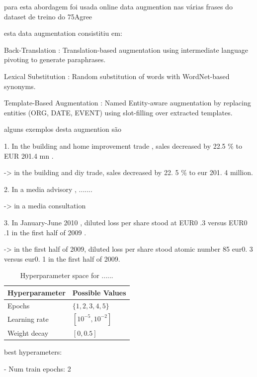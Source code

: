 \documentclass[conference]{IEEEtran}
\begin{document}
para esta abordagem foi usada online data augmention nas várias frases do dataset de treino do 75Agree

esta data augmentation consistitiu em:

Back-Translation : Translation-based augmentation using intermediate language pivoting to generate paraphrases.


Lexical Substitution : Random substitution of words with WordNet-based synonyms.


Template-Based Augmentation : Named Entity-aware augmentation by replacing entities (ORG, DATE, EVENT) using slot-filling over extracted templates.


alguns exemplos desta augmention são

1. In the building and home improvement trade , sales decreased by 22.5 \% to EUR 201.4 mn .

-> in the building and diy trade, sales decreased by 22. 5 \% to eur 201. 4 million.

2. In a media advisory , .......

-> in a media consultation

3. In January-June 2010 , diluted loss per share stood at EUR0 .3 versus EUR0 .1 in the first half of 2009 .

-> in the first half of 2009, diluted loss per share stood atomic number 85 eur0. 3 versus eur0. 1 in the first half of 2009.




\begin{table}[H]
\centering
\caption{Hyperparameter space for ......}
\label{parameters_basebert}
\begin{tabular}{ll}
\toprule
\textbf{Hyperparameter} & \textbf{Possible Values} \\
\midrule
Epochs & $\{1,2,3,4,5\}$ \\
Learning rate & $[10^{-5}, 10^{-2}]$ \\
Weight decay & $[0, 0.5]$ \\
\bottomrule
\end{tabular}
\end{table}

best hyperameters: 

- Num train epochs: 2
\end{document}
